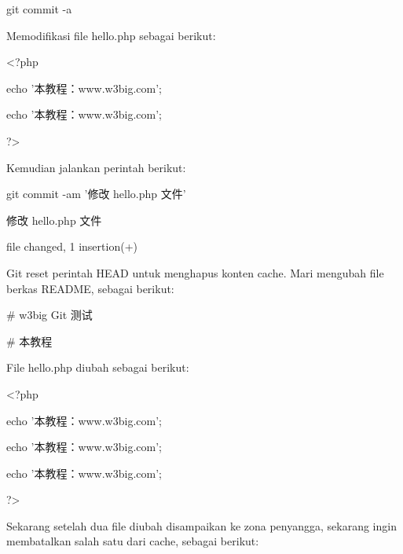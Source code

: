 \noindent 
{\fontsize{10pt}{10pt}\selectfont git commit -a} \par
\vspace{12pt}
\noindent 
Memodifikasi file hello.php sebagai berikut:  \par
\noindent 
{\fontsize{10pt}{10pt}\selectfont <?php} \par
\noindent 
{\fontsize{10pt}{10pt}\selectfont echo '本教程：www.w3big.com';} \par
\noindent 
{\fontsize{10pt}{10pt}\selectfont echo '本教程：www.w3big.com';} \par
\noindent 
{\fontsize{10pt}{10pt}\selectfont ?>} \par
\vspace{10pt}
\noindent 
Kemudian jalankan perintah berikut:  \par
\noindent 
{\fontsize{10pt}{10pt}\selectfont git commit -am '修改 hello.php 文件'} \par
\noindent 
{\fontsize{10pt}{10pt}\selectfont [master 71ee2cb] 修改 hello.php 文件} \par
\noindent 
{\fontsize{10pt}{10pt} file changed, 1 insertion(+)} \par
\vspace{10pt}
\hspace*{0.5in} Git reset perintah HEAD untuk menghapus konten cache.  Mari mengubah file berkas README, sebagai berikut:  \par
\noindent 
{\fontsize{10pt}{10pt}\selectfont  $  \#  $ w3big Git 测试} \par
\noindent 
{\fontsize{10pt}{10pt}\selectfont  $  \#  $ 本教程 } \par
\vspace{12pt}
\noindent 
File hello.php diubah sebagai berikut:  \par
\noindent 
{\fontsize{10pt}{10pt}\selectfont <?php} \par
\noindent 
{\fontsize{10pt}{10pt}\selectfont echo '本教程：www.w3big.com';} \par
\noindent 
{\fontsize{10pt}{10pt}\selectfont echo '本教程：www.w3big.com';} \par
\noindent 
{\fontsize{10pt}{10pt}\selectfont echo '本教程：www.w3big.com';} \par
\noindent 
{\fontsize{10pt}{10pt}\selectfont ?>} \par
\vspace{10pt}
\hspace*{0.5in} Sekarang setelah dua file diubah disampaikan ke zona penyangga, sekarang ingin membatalkan salah satu dari cache, sebagai berikut: \par
